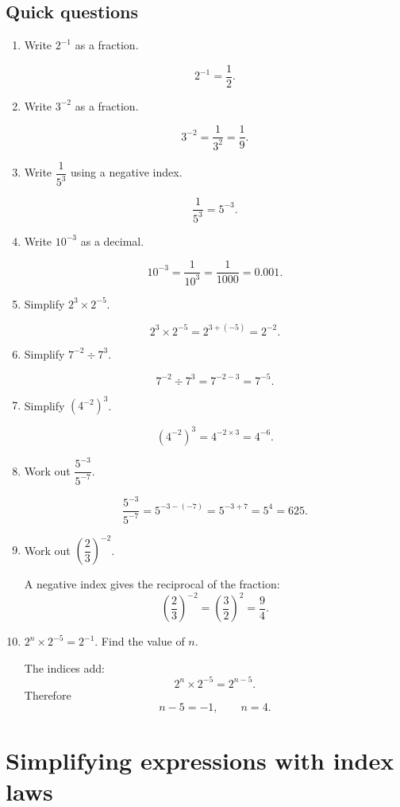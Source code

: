 \documentclass[11pt]{article}
\begin{document}
\subsection*{Quick questions}
\begin{enumerate}
\item Write $2^{-1}$ as a fraction.

\[
2^{-1}=\frac{1}{2}.
\]

\item Write $3^{-2}$ as a fraction.

\[
3^{-2}=\frac{1}{3^2}=\frac{1}{9}.
\]

\item Write $\dfrac{1}{5^3}$ using a negative index.

\[
\frac{1}{5^3}=5^{-3}.
\]

\item Write $10^{-3}$ as a decimal.

\[
10^{-3}=\frac{1}{10^3}=\frac{1}{1000}=0.001.
\]

\item Simplify $2^3\times2^{-5}$.

\[
2^3\times2^{-5}=2^{3+(-5)}=2^{-2}.
\]

\item Simplify $7^{-2}\div7^3$.

\[
7^{-2}\div7^3=7^{-2-3}=7^{-5}.
\]

\item Simplify $\left(4^{-2}\right)^3$.

\[
\left(4^{-2}\right)^3=4^{-2\times3}=4^{-6}.
\]

\item Work out $\dfrac{5^{-3}}{5^{-7}}$.

\[
\frac{5^{-3}}{5^{-7}}=5^{-3-(-7)}=5^{-3+7}=5^4=625.
\]

\item Work out $\left(\dfrac{2}{3}\right)^{-2}$.

A negative index gives the reciprocal of the fraction:
\[
\left(\frac{2}{3}\right)^{-2}=\left(\frac{3}{2}\right)^2=\frac{9}{4}.
\]

\item $2^n\times2^{-5}=2^{-1}$. Find the value of $n$.

The indices add:
\[
2^n\times2^{-5}=2^{n-5}.
\]
Therefore
\[
n-5=-1,\qquad n=4.
\]
\end{enumerate}

\section{Simplifying expressions with index laws}
\end{document}
